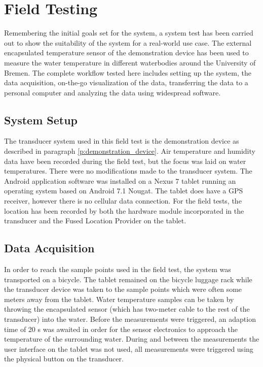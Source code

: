\section{Field Testing}
Remembering the initial goals set for the system, a system test has been carried out to show the suitability of the system for a real-world use case. The external encapsulated temperature sensor of the demonstration device has been used to measure the water temperature in different waterbodies around the University of Bremen. The complete workflow tested here includes setting up the system, the data acquisition, on-the-go visualization of the data, transferring the data to a personal computer and analyzing the data using widespread software.

\subsection{System Setup}
The transducer system used in this field test is the demonstration device as described in paragraph \ref{p:demonstration_device}. Air temperature and humidity data have been recorded during the field test, but the focus was laid on water temperatures. There were no modifications made to the transducer system. The Android application software was installed on a Nexus 7 tablet running an operating system based on Android 7.1 Nougat. The tablet does have a GPS receiver, however there is no cellular data connection. For the field tests, the location has been recorded by both the hardware module incorporated in the transducer and the Fused Location Provider on the tablet.

\subsection{Data Acquisition}
In order to reach the sample points used in the field test, the system was transported on a bicycle. The tablet remained on the bicycle luggage rack while the transducer device was taken to the sample points which were often some meters away from the tablet. Water temperature samples can be taken by throwing the encapsulated sensor (which has two-meter cable to the rest of the transducer) into the water. Before the measurements were triggered, an adaption time of 20 s was awaited in order for the sensor electronics to approach the temperature of the surrounding water. During and between the measurements the user interface on the tablet was not used, all measurements were triggered using the physical button on the transducer.

